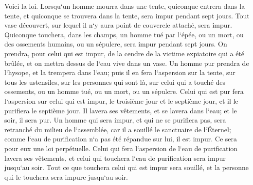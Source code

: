 \verse Voici la loi. Lorsqu`un homme mourra dans une tente, quiconque entrera dans la tente, et quiconque se trouvera dans la tente, sera impur pendant sept jours. 
\verse Tout vase découvert, sur lequel il n`y aura point de couvercle attaché, sera impur. 
\verse Quiconque touchera, dans les champs, un homme tué par l`épée, ou un mort, ou des ossements humains, ou un sépulcre, sera impur pendant sept jours. 
\verse On prendra, pour celui qui est impur, de la cendre de la victime expiatoire qui a été brûlée, et on mettra dessus de l`eau vive dans un vase. 
\verse Un homme pur prendra de l`hysope, et la trempera dans l`eau; puis il en fera l`aspersion sur la tente, sur tous les ustensiles, sur les personnes qui sont là, sur celui qui a touché des ossements, ou un homme tué, ou un mort, ou un sépulcre. 
\verse Celui qui est pur fera l`aspersion sur celui qui est impur, le troisième jour et le septième jour, et il le purifiera le septième jour. Il lavera ses vêtements, et se lavera dans l`eau; et le soir, il sera pur. 
\verse Un homme qui sera impur, et qui ne se purifiera pas, sera retranché du milieu de l`assemblée, car il a souillé le sanctuaire de l`Éternel; comme l`eau de purification n`a pas été répandue sur lui, il est impur. 
\verse Ce sera pour eux une loi perpétuelle. Celui qui fera l`aspersion de l`eau de purification lavera ses vêtements, et celui qui touchera l`eau de purification sera impur jusqu`au soir. 
\verse Tout ce que touchera celui qui est impur sera souillé, et la personne qui le touchera sera impure jusqu`au soir. 

